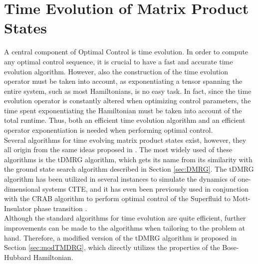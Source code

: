 \section{Time Evolution of Matrix Product States}
A central component of Optimal Control is time evolution. In order to compute any optimal control sequence, it is crucial to have a fast and accurate time evolution algorithm. However, also the construction of the time evolution operator must be taken into account, as exponentiating a tensor spanning the entire system, such as most Hamiltonians, is no easy task. In fact, since the time evolution operator is constantly altered when optimizing control parameters, the time spent exponentiating the Hamiltonian must be taken into account of the total runtime. Thus, both an efficient time evolution algorithm and an efficient operator exponentiation is needed when performing optimal control.\\
Several algorithms for time evolving matrix product states exist, however, they all origin from the same ideas proposed in \cite{Vidal2003,Vidal2004}. The most widely used of these algorithms is the tDMRG algorithm, which gets its name from its similarity with the ground state search algorithm described in Section \ref{sec:DMRG}. The tDMRG algorithm has been utilized in several instances to simulate the dynamics of one-dimensional systems CITE, and it has even been previously used in conjunction with the CRAB algorithm to perform optimal control of the Superfluid to Mott-Insulator phase transition \cite{FrankBloch,Doria2011}.\\
Although the standard algorithms for time evolution are quite efficient, further improvements can be made to the algorithms when tailoring to the problem at hand. Therefore, a modified version of the tDMRG algorithm is proposed in Section \ref{sec:modTMDRG}, which directly utilizes the properties of the Bose-Hubbard Hamiltonian.


